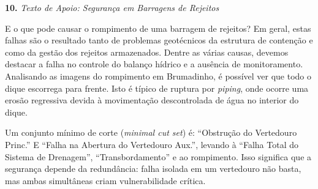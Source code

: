 \documentclass[12pt,a4paper,twoside]{report}
\begin{document}
\vspace{0.5cm}

\textbf{10.} \textit{Texto de Apoio: Seguran\c{c}a em Barragens de Rejeitos}

E o que pode causar o rompimento de uma barragem de rejeitos? Em geral, estas falhas s\~ao o resultado tanto de problemas geot\'ecnicos da estrutura de conten\c{c}\~ao e como da gest\~ao dos rejeitos armazenados. Dentre as v\'arias causas, devemos destacar a falha no controle do balan\c{c}o h\'idrico e a aus\^encia de monitoramento. Analisando as imagens do rompimento em Brumadinho, \'e poss\'ivel ver que todo o dique escorrega para frente. Isto \'e t\'ipico de ruptura por \textit{piping}, onde ocorre uma eros\~ao regressiva devida \`a movimenta\c{c}\~ao descontrolada de \'agua no interior do dique. 

Um conjunto m\'inimo de corte (\textit{minimal cut set}) \'e: ``Obstru\c{c}\~ao do Vertedouro Princ.'' E ``Falha na Abertura do Vertedouro Aux.'', levando \`a ``Falha Total do Sistema de Drenagem'', ``Transbordamento'' e ao rompimento. Isso significa que a seguran\c{c}a depende da redund\^ancia: falha isolada em um vertedouro n\~ao basta, mas ambas simult\^aneas criam vulnerabilidade cr\'itica.

\small{}
\end{document}
